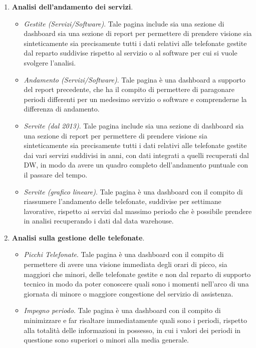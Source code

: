 \begin{enumerate}
\begin{itemize}
        \end{itemize}
    \item \textbf{Analisi dell'andamento dei servizi}.
        \begin{itemize}
            \item \textit{Gestite (Servizi/Software)}. Tale pagina include sia una sezione di dashboard sia una sezione di report per permettere di prendere visione sia sinteticamente sia precisamente tutti i dati relativi alle telefonate gestite dal reparto suddivise rispetto al servizio o al software per cui si vuole svolgere l'analisi.
            \item \textit{Andamento (Servizi/Software)}. Tale pagina è una dashboard a supporto del report precedente, che ha il compito di permettere di paragonare periodi differenti per un medesimo servizio o software e comprenderne la differenza di andamento.
            \item \textit{Servite (dal 2013)}. Tale pagina include sia una sezione di dashboard sia una sezione di report per permettere di prendere visione sia sinteticamente sia precisamente tutti i dati relativi alle telefonate gestite dai vari servizi suddivisi in anni, con dati integrati a quelli recuperati dal DW, in modo da avere un quadro completo dell'andamento puntuale con il passare del tempo.
            \item \textit{Servite (grafico lineare)}. Tale pagina è una dashboard con il compito di riassumere l'andamento delle telefonate, suddivise per settimane lavorative, rispetto ai servizi dal massimo periodo che è possibile prendere in analisi recuperando i dati dal data warehouse.
        \end{itemize}
    \item \textbf{Analisi sulla gestione delle telefonate}.
        \begin{itemize}
        \item \textit{Picchi Telefonate}. Tale pagina è una dashboard con il compito di permettere di avere una visione immediata degli orari di picco, sia maggiori che minori, delle telefonate gestite e non dal reparto di supporto tecnico in modo da poter conoscere quali sono i momenti nell'arco di una giornata di minore o maggiore congestione del servizio di assistenza.
        \item \textit{Impegno periodo}. Tale pagina è una dashboard con il compito di minimizzare e far risaltare immediatamente quali sono i periodi, rispetto alla totalità delle informazioni in possesso, in cui i valori dei periodi in questione sono superiori o minori alla media generale.

\end{itemize}
\end{enumerate}
